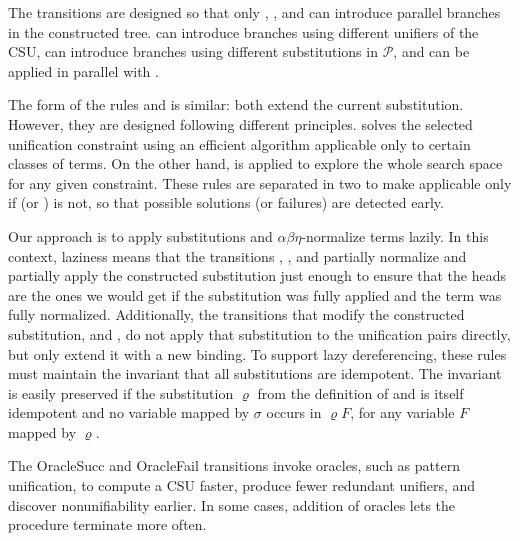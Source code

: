 The transitions are designed so that only ,
, and  can introduce parallel branches in the
constructed tree.  can introduce branches
using different unifiers of the CSU,  can introduce branches 
using different substitutions in $\mathcal{P}$, and 
can be applied in parallel with . 

The form of the rules  and  is similar: both
extend the current substitution. However,
they are designed following different principles.  solves
the selected unification constraint using an efficient algorithm applicable only
to certain classes of terms. On the other hand,  is applied to
explore the whole search space for any given constraint. These rules are separated
in two to make  applicable only if 
(or ) is not, so that possible solutions (or failures) are
detected early.

Our approach is to apply substitutions and $\alpha\beta\eta$-normalize terms
lazily. In this context, laziness means that the transitions
, , and
 partially normalize and partially apply the constructed
substitution just enough to ensure that the heads are the ones we would get if
the substitution was fully applied and the term was fully normalized. 
Additionally, the transitions that modify the constructed substitution,
 and , do not apply that substitution to the
unification pairs directly, but only extend it with a new binding. To support
lazy dereferencing, these rules must maintain the
invariant that all substitutions are idempotent. The invariant is easily
preserved if the substitution $\varrho$ from the definition of
 and  is itself idempotent and no variable
mapped by $\sigma$ occurs in $\varrho F$, for any variable $F$ mapped by
$\varrho$.

The \textsf{OracleSucc} and \textsf{OracleFail} transitions
invoke oracles, such as pattern unification,
to compute a CSU faster,
produce fewer redundant unifiers, and
discover nonunifiability earlier.
In some cases, addition of oracles lets the procedure terminate more often.

